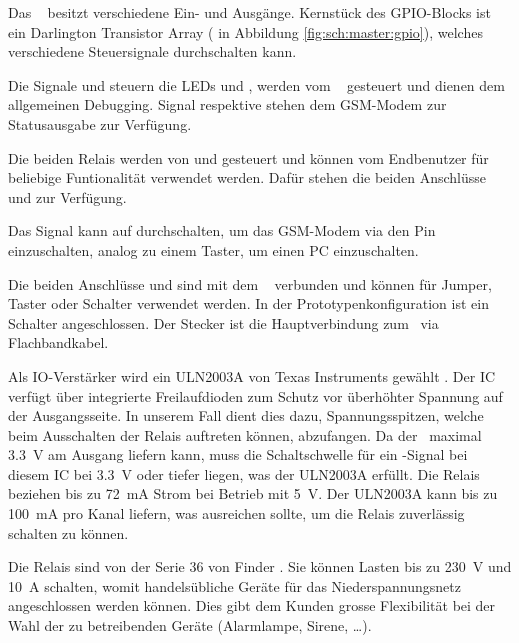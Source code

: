 Das  \Master~  besitzt  verschiedene  Ein-  und   Ausg\"ange. Kernst\"uck  des
GPIO-Blocks  ist  ein Darlington  Transistor  Array  ( in  Abbildung
\ref{fig:sch:master:gpio}),  welches verschiedene  Steuersignale durchschalten
kann.

Die  Signale    und   steuern  die  LEDs    und
,   werden  vom   \Raspi~  gesteuert   und  dienen   dem  allgemeinen
Debugging. Signal    respektive    stehen  dem
GSM-Modem zur Statusausgabe zur Verf\"ugung.

Die   beiden  Relais   werden  von     und     gesteuert
und  k\"onnen  vom  Endbenutzer   f\"ur  beliebige  Funtionalit\"at  verwendet
werden. Daf\"ur stehen  die beiden  Anschl\"usse  und   zur
Verf\"ugung.

Das Signal  kann auf  durchschalten, um das GSM-Modem
via den Pin   einzuschalten, analog zu einem  Taster, um einen
PC einzuschalten.

Die  beiden  Anschl\"usse    und   sind  mit  dem  \Raspi~
verbunden und k\"onnen f\"ur Jumper, Taster oder Schalter verwendet werden. In
der  Prototypenkonfiguration  ist   ein  Schalter  angeschlossen. Der  Stecker
 ist die Hauptverbindung zum \Raspi~via Flachbandkabel.

Als  IO-Verst\"arker  wird  ein   ULN2003A  von  Texas  Instruments  gew\"ahlt
\cite{datasheet:darlingtonic}. Der    IC    verf\"ugt    \"uber    integrierte
Freilaufdioden   zum    Schutz   vor    \"uberh\"ohter   Spannung    auf   der
Ausgangsseite. In unserem Fall dient  dies dazu, Spannungsspitzen, welche beim
Ausschalten der Relais auftreten k\"onnen,  abzufangen.  Da der \Raspi~maximal
\SI{3.3}{\volt} am  Ausgang liefern  kann, muss  die Schaltschwelle  f\"ur ein
-Signal bei diesem  IC bei \SI{3.3}{\volt} oder  tiefer liegen, was
der  ULN2003A erf\"ullt.   Die Relais  beziehen bis  zu \SI{72}{\milli\ampere}
\cite{datasheet:finder36relais}  Strom  bei   Betrieb  mit  \SI{5}{\volt}. Der
ULN2003A kann bis zu \SI{100}{\milli\ampere} pro Kanal liefern, was ausreichen
sollte, um die Relais zuverl\"assig schalten zu k\"onnen.

Die     Relais      sind     von      der     Serie     36      von     Finder
\cite{datasheet:finder36relais}. Sie  k\"onnen Lasten  bis zu  \SI{230}{\volt}
und  \SI{10}{\ampere}  schalten,  womit handels\"ubliche  Ger\"ate  f\"ur  das
Niederspannungsnetz angeschlossen werden k\"onnen. Dies gibt dem Kunden grosse
Flexibilit\"at bei der Wahl der  zu betreibenden Ger\"ate (Alarmlampe, Sirene,
\ldots).


